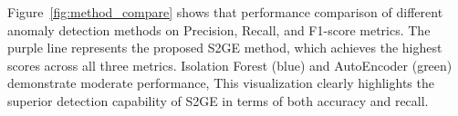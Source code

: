 \begin{ZhChapter}
    \newpage
    Figure~\ref{fig:method_compare} shows that performance comparison of different anomaly detection methods on Precision, Recall, and F1-score metrics.
    The purple line represents the proposed S2GE method, which achieves the highest scores across all three metrics.
    Isolation Forest (blue) and AutoEncoder (green) demonstrate moderate performance,
    This visualization clearly highlights the superior detection capability of S2GE in terms of both accuracy and recall.




\end{ZhChapter}